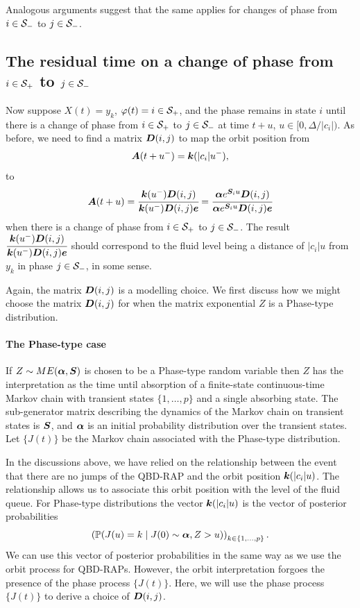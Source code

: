 Analogous arguments suggest that the same applies for changes of phase from \(i\in\mathcal{S}_-\) to \(j\in\mathcal{S}_-\). 

\subsection{The residual time on a change of phase from \(i\in\mathcal{S}_+\) to \(j\in\mathcal{S}_-\)} 
Now suppose \(X(t)=y_k\), \(\varphi(t)=i\in\mathcal{S}_+\), and the phase remains in state \(i\) until there is a change of phase from \(i\in\mathcal{S}_+\) to \(j\in\mathcal{S}_-\) at time \(t+u\), \(u\in{}[0,\Delta/|c_i|)\). %
As before, we need to find a matrix \(\boldsymbol D(i,j)\) to map the orbit position from \[\boldsymbol A(t+u^-) = \boldsymbol k(|c_i|u^-),\] 
to 
\[\boldsymbol A(t+u) = \cfrac{\boldsymbol k(u^-)\boldsymbol D(i,j)}{\boldsymbol k(u^-)\boldsymbol D(i,j)\boldsymbol e}=\cfrac{\boldsymbol\alpha e^{\boldsymbol S_iu} \boldsymbol D(i,j)}{\boldsymbol\alpha e^{\boldsymbol S_iu}\boldsymbol D(i,j)\boldsymbol e}\] when there is a change of phase from \(i\in\mathcal{S}_+\) to \(j\in\mathcal{S}_-\). The result \(\cfrac{\boldsymbol k(u^-)\boldsymbol D(i,j)}{\boldsymbol k(u^-)\boldsymbol D(i,j)\boldsymbol e}\) should correspond to the fluid level being a distance of \(|c_i|u\) from \(y_k\) in phase \(j\in\mathcal{S}_-\), in some sense. 

Again, the matrix \(\boldsymbol D(i,j)\) is a modelling choice. We first discuss how we might choose the matrix \(\boldsymbol D(i,j)\) for when the matrix exponential \(Z\) is a Phase-type distribution. 

\paragraph{The Phase-type case}
If \(Z\sim ME(\boldsymbol \alpha, \boldsymbol S)\) is chosen to be a Phase-type random variable then \(Z\) has the interpretation as the time until absorption of a finite-state continuous-time Markov chain with transient states \(\{1,\dots,p\}\) and a single absorbing state. The sub-generator matrix describing the dynamics of the Markov chain on transient states is \(\boldsymbol S\), and \(\boldsymbol \alpha\) is an initial probability distribution over the transient states. Let \(\{J(t)\}\) be the Markov chain associated with the Phase-type distribution. 

In the discussions above, we have relied on the relationship between the event that there are no jumps of the QBD-RAP and the orbit position \(\displaystyle \boldsymbol k(|c_i|u)\). The relationship allows us to associate this orbit position with the level of the fluid queue. For Phase-type distributions the vector \(\boldsymbol k(|c_i|u)\) is the vector of posterior probabilities \[\left(\mathbb P(J(u)=k \mid J(0)\sim\boldsymbol\alpha, Z>u)\right)_{k\in\{1,...,p\}}.\] We can use this vector of posterior probabilities in the same way as we use the orbit process for QBD-RAPs. However, the orbit interpretation forgoes the presence of the phase process \(\{J(t)\}\). Here, we will use the phase process \(\{J(t)\}\) to derive a choice of \(\boldsymbol D(i,j)\). 

